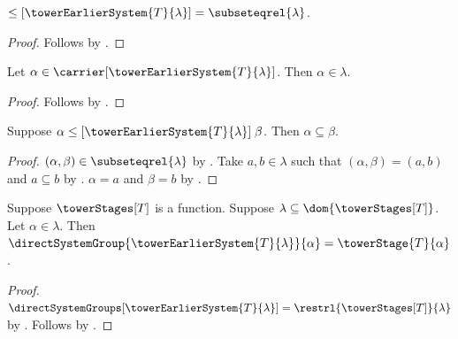 \begin{proposition}\label{tower_earlier_system_order}
    $\leq[\towerEarlierSystem{T}{\lambda}]=
        \subseteqrel{\lambda}$.
\end{proposition}
\begin{proof}
    Follows by
        .
\end{proof}

\begin{proposition}\label{tower_earlier_system_index_member}
    Let $\alpha\in
        \carrier[\towerEarlierSystem{T}{\lambda}]$.
    Then $\alpha\in\lambda$.
\end{proposition}
\begin{proof}
    Follows by .
\end{proof}

\begin{proposition}\label{tower_earlier_system_indices_ordered}
    Suppose $\alpha\mathrel{
        \leq[\towerEarlierSystem{T}{\lambda}]}\beta$.
    Then $\alpha\subseteq\beta$.
\end{proposition}
\begin{proof}
    $(\alpha,\beta)\in\subseteqrel{\lambda}$ by
        .
    Take $a,b\in\lambda$ such that
        $(\alpha,\beta)=(a,b)$ and $a\subseteq b$ by
        .
    $\alpha=a$ and $\beta=b$ by .
\end{proof}

\begin{proposition}\label{tower_earlier_system_group}
    Suppose $\towerStages[T]$ is a function.
    Suppose $\lambda\subseteq\dom{\towerStages[T]}$.
    Let $\alpha\in\lambda$.
    Then $\directSystemGroup{\towerEarlierSystem{T}{\lambda}}{\alpha}
        =\towerStage{T}{\alpha}$.
\end{proposition}
\begin{proof}
    $\directSystemGroups[\towerEarlierSystem{T}{\lambda}]
        =\restrl{\towerStages[T]}{\lambda}$ by
        .
    Follows by
        .
\end{proof}

